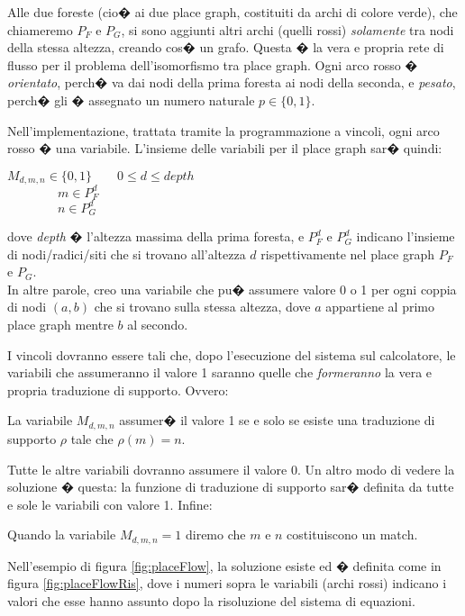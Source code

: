 Alle due foreste (cio� ai due place graph, costituiti da archi di colore verde), che chiameremo $P_F$ e $P_G$, si sono aggiunti altri archi (quelli rossi) \emph{solamente} tra nodi della stessa altezza, creando cos� un grafo. Questa � la vera e propria rete di flusso per il problema dell'isomorfismo tra place graph. Ogni arco rosso � \emph{orientato}, perch� va dai nodi della prima foresta ai nodi della seconda, e \emph{pesato}, perch� gli � assegnato un numero naturale $p \in \{ 0, 1\}$.

Nell'implementazione, trattata tramite la programmazione a vincoli, ogni arco rosso � una variabile. L'insieme delle variabili per il place graph sar� quindi:
\begin{center}
$M_{d,m,n} \in \{ 0, 1\} \qquad 0 \le d \le depth \qquad$\\ $\qquad \qquad m \in P_F^d$ \\ $\qquad \qquad n \in P_G^d$
\end{center}
dove \emph{depth} � l'altezza massima della prima foresta, e $P_F^d$ e $P_G^d$ indicano l'insieme di nodi/radici/siti che si trovano all'altezza $d$ rispettivamente nel place graph $P_F$ e $P_G$.\\
In altre parole, creo una variabile che pu� assumere valore 0 o 1 per ogni coppia di nodi $(a,b)$ che si trovano sulla stessa altezza, dove $a$ appartiene al primo place graph mentre $b$ al secondo.

I vincoli dovranno essere tali che, dopo l'esecuzione del sistema sul calcolatore, le variabili che assumeranno il valore 1 saranno quelle che \emph{formeranno} la vera e propria traduzione di supporto. Ovvero: 
\begin{prop}\label{prop:traduzioneSupporto}
La variabile $M_{d,m,n}$ assumer� il valore 1 se e solo se esiste una traduzione di supporto $\rho$ tale che $\rho(m)=n$.
\end{prop}
Tutte le altre variabili dovranno assumere il valore 0. Un altro modo di vedere la soluzione � questa: la funzione di traduzione di supporto sar� definita da tutte e sole le variabili con valore 1. Infine: 
\begin{term}\label{term:matchVariabili}
Quando la variabile $M_{d,m,n}=1$ diremo che $m$ e $n$ costituiscono un match.
\end{term}

Nell'esempio di figura \ref{fig:placeFlow}, la soluzione esiste ed � definita come in figura \ref{fig:placeFlowRis}, dove i numeri sopra le variabili (archi rossi) indicano i valori che esse hanno assunto dopo la risoluzione del sistema di equazioni.



